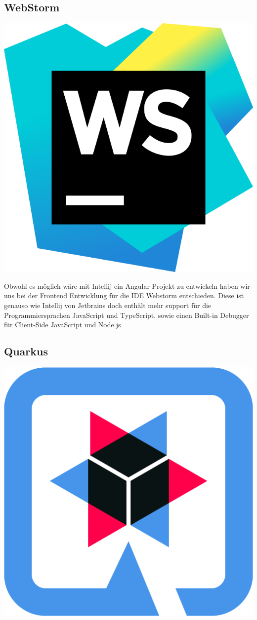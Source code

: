 \subsection{WebStorm}
\includegraphics[scale=0.025]{pics/WebStormLogo.svg.png}


Obwohl es möglich wäre mit Intellij ein Angular Projekt zu entwickeln haben wir uns bei der Frontend Entwicklung 
für die IDE Webstorm entschieden. Diese ist genauso wie Intellij von Jetbrains doch enthält mehr support für die 
Programmiersprachen JavaScript und TypeScript, sowie einen Built-in Debugger für Client-Side JavaScript und Node.js 

\subsection{Quarkus}
\includegraphics[scale=0.015]{pics/quarkusLogo.png}

